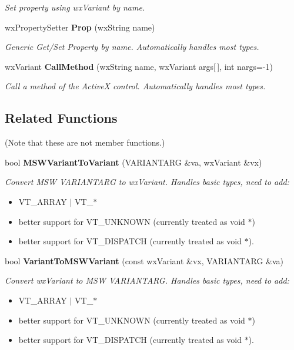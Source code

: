 \begin{CompactItemize}
\begin{CompactList}\small\item\em Set property using wx\-Variant by name.\item\end{CompactList}\item 
wx\-Property\-Setter {\bf Prop} (wx\-String name)
\begin{CompactList}\small\item\em Generic Get/Set Property by name. Automatically handles most types.\item\end{CompactList}\item 
wx\-Variant {\bf Call\-Method} (wx\-String name, wx\-Variant args[$\,$], int nargs=-1)
\begin{CompactList}\small\item\em Call a method of the Active\-X control. Automatically handles most types.\item\end{CompactList}\end{CompactItemize}
\subsection*{Related Functions}
(Note that these are not member functions.)\begin{CompactItemize}
\item 
bool {\bf MSWVariant\-To\-Variant} (VARIANTARG \&va, wx\-Variant \&vx)
\begin{CompactList}\small\item\em Convert MSW VARIANTARG to wx\-Variant. Handles basic types, need to add:\begin{itemize}
\item VT\_\-ARRAY $|$ VT\_\-$\ast$\item better support for VT\_\-UNKNOWN (currently treated as void $\ast$)\item better support for VT\_\-DISPATCH (currently treated as void $\ast$).\end{itemize}
\item\end{CompactList}\item 
bool {\bf Variant\-To\-MSWVariant} (const wx\-Variant \&vx, VARIANTARG \&va)
\begin{CompactList}\small\item\em Convert wx\-Variant to MSW VARIANTARG. Handles basic types, need to add:\begin{itemize}
\item VT\_\-ARRAY $|$ VT\_\-$\ast$\item better support for VT\_\-UNKNOWN (currently treated as void $\ast$)\item better support for VT\_\-DISPATCH (currently treated as void $\ast$).\end{itemize}
\item\end{CompactList}\end{CompactItemize}



